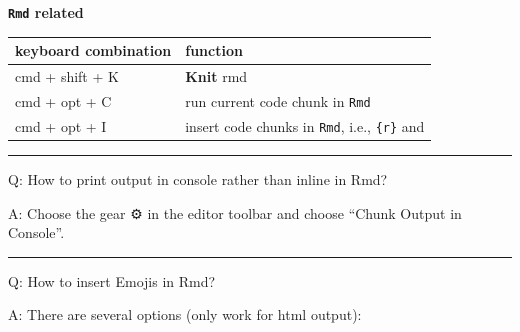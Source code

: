 \documentclass[
  a4paper,
  twoside,
  openright]{book}
\theoremstyle{definition}
\theoremstyle{definition}
\theoremstyle{definition}
\theoremstyle{definition}
\theoremstyle{remark}
\begin{document}
{\textbf{\texttt{Rmd} related}}

\begin{longtable}[]{@{}
  >{\raggedright\arraybackslash}p{}
  >{\raggedright\arraybackslash}p{}@{}}
\toprule\noalign{}
\begin{minipage}[b]{\linewidth}\raggedright
keyboard combination
\end{minipage} & \begin{minipage}[b]{\linewidth}\raggedright
function
\end{minipage} \\
\midrule\noalign{}
\endhead
\bottomrule\noalign{}
\endlastfoot
cmd + shift + K & \textbf{Knit} rmd \\
cmd + opt + C & run current code chunk in \texttt{Rmd} \\
cmd + opt + I & insert code chunks in \texttt{Rmd}, i.e., \texttt{\textasciigrave{}\textasciigrave{}\textasciigrave{}\{r\}} and \texttt{\textasciigrave{}\textasciigrave{}\textasciigrave{}} \\
\end{longtable}

\begin{center}\rule{0.5\linewidth}{0.5pt}\end{center}

Q: How to print output in console rather than inline in Rmd?

A: Choose the gear ⚙️ in the editor toolbar and choose ``Chunk Output in Console''.

\begin{center}\rule{0.5\linewidth}{0.5pt}\end{center}

Q: How to insert Emojis in Rmd?

A: There are several options (only work for html output):
\end{document}
